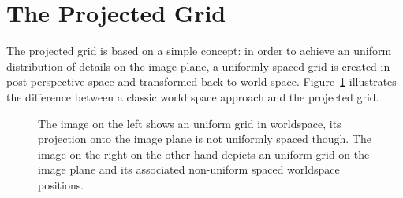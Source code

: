 \section{The Projected Grid}
\label{sec_projected_grid}
The projected grid is based on a simple concept: in order to achieve an
uniform distribution of details on the image plane, a uniformly spaced grid is
created in post-perspective space and transformed back to world space.
Figure~\ref{fig:projectedgrid} illustrates the difference between a classic
world space approach and the projected grid.
\begin{figure}[h]
\centering
{}
\caption{The image on the left shows an uniform grid in worldspace,
its projection onto the image plane is not uniformly spaced though.
The image on the right on the other hand depicts an uniform grid on
the image plane and its associated non-uniform spaced worldspace
positions.}
\label{fig:projectedgrid}
\end{figure}

